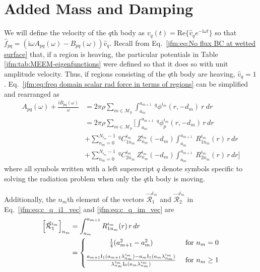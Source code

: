 \section{Added Mass and Damping}\label{jfm:appC}
We will define the velocity of the $q$th body as 
$v_q(t) = \mathrm{Re} \{ \hat{v}_q e^{- \text{i} \omega t}\}$ 
so that $\hat{f}_{pq} = (\text{i} \omega A_{pq}(\omega) - B_{pq}(\omega)) \hat{v}_q$. 
Recall from Eq.~\ref{jfm:eq:No flux BC at wetted surface} that, if a region is heaving, 
the particular potentials in Table \ref{jfm:tab:MEEM-eigenfunctions} were defined so that it does so with unit amplitude velocity. 
Thus, if regions consisting of the $q$th body are heaving, $\hat{v}_q=1$. 
Eq.~\ref{jfm:eq:freq domain scalar rad force in terms of regions} can be simplified and rearranged as
\begin{equation}\label{jfm:eq:freq domain scalar rad force in terms of added mass and damping}
\begin{aligned}
    A_{pq}(\omega) + \frac{\text{i}B_{pq}(\omega)}{\omega} 
    &= 2 \pi \rho \sum_{m \in \mathcal{M}_p} \int_{a_m}^{a_{m+1}} \ _{}^{q}\phi^{i_m}(r,-d_m) \ r  \ dr \\
    &= 2 \pi \rho \sum_{m \in \mathcal{M}_p} \Bigg[
    \int_{a_{m}}^{a_{{m+1}}} \ _{}^{q}\phi^{i_m}_p(r,-d_m)\, r\, dr \\
    & + \sum_{n_m=0}^{N_{i_m}-1} 
    \ _{}^{q}C_{1n_m}^{i_m} \ Z_{n_m}^{i_m}(-d_m)
    \int_{a_{m}}^{a_{{m+1}}} \ R_{1n_m}^{i_m}(r)\, r\, dr \\
    & + \sum_{n_m=0}^{N_{i_m}-1} 
    \ _{}^{q}C_{2n_m}^{i_m} \ Z_{n_m}^{i_m}(-d_m)
    \int_{a_{m}}^{a_{{m+1}}} \ R_{2n_m}^{i_m}(r)\, r\, dr
    \Bigg]
\end{aligned}
\end{equation}
where all symbols written with a left superscript $q$ denote 
symbols specific to solving the radiation problem when only the $q$th body is moving.

Additionally, the $n_m$th element of the vectors 
$\vec{\mathcal{R}}_{1}^{i_m}$ and $\vec{\mathcal{R}}_{2}^{i_m}$ 
in Eq.~\ref{jfm:eq:c_q_i1_vec} and \ref{jfm:eq:c_q_im_vec} are 
\begin{equation}\label{jfm:radial integral 1}
\begin{aligned}\relax
    \left[\vec{\mathcal{R}}_{1}^{i_m}\right]_{n_m} 
    & = \int_{a_{m}}^{a_{{m+1}}} R_{1n_m}^{i_m}(r)\, r\, dr \\
    & = \left\{\begin{matrix}
    \frac{1}{4} (a_{{m+1}}^2-a_{m}^2) & \text{ for } n_m=0 \\[2ex]
 \frac{a_{{m+1}} \mathrm{I}_1(a_{{m+1}} \lambda_{n_m}^{i_m})-a_{m} \mathrm{I}_1(a_{m} \lambda_{n_m}^{i_m})}{\lambda_{n_m}^{i_m}\mathrm{I}_0(a_{{m}}\lambda_{n_m}^{i_m})} 
 & \text{ for } n_m \ge 1
\end{matrix}\right.
\end{aligned}
\end{equation}


